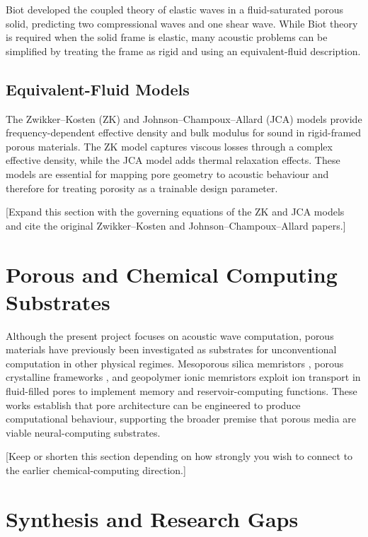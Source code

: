 Biot \cite{biot1956theory} developed the coupled theory of elastic waves in a fluid-saturated porous solid, predicting two compressional waves and one shear wave. While Biot theory is required when the solid frame is elastic, many acoustic problems can be simplified by treating the frame as rigid and using an equivalent-fluid description.

\subsection{Equivalent-Fluid Models}
\label{subsec:equivalent_fluid}

The Zwikker--Kosten (ZK) and Johnson--Champoux--Allard (JCA) models provide frequency-dependent effective density and bulk modulus for sound in rigid-framed porous materials. The ZK model captures viscous losses through a complex effective density, while the JCA model adds thermal relaxation effects. These models are essential for mapping pore geometry to acoustic behaviour and therefore for treating porosity as a trainable design parameter.

[Expand this section with the governing equations of the ZK and JCA models and cite the original Zwikker--Kosten and Johnson--Champoux--Allard papers.]

\section{Porous and Chemical Computing Substrates}
\label{sec:porous_substrates}

Although the present project focuses on acoustic wave computation, porous materials have previously been investigated as substrates for unconventional computation in other physical regimes. Mesoporous silica memristors \cite{jaafar2022mesoporous}, porous crystalline frameworks \cite{ding2023porous}, and geopolymer ionic memristors exploit ion transport in fluid-filled pores to implement memory and reservoir-computing functions. These works establish that pore architecture can be engineered to produce computational behaviour, supporting the broader premise that porous media are viable neural-computing substrates.

[Keep or shorten this section depending on how strongly you wish to connect to the earlier chemical-computing direction.]

\section{Synthesis and Research Gaps}
\label{sec:lr_synthesis}

